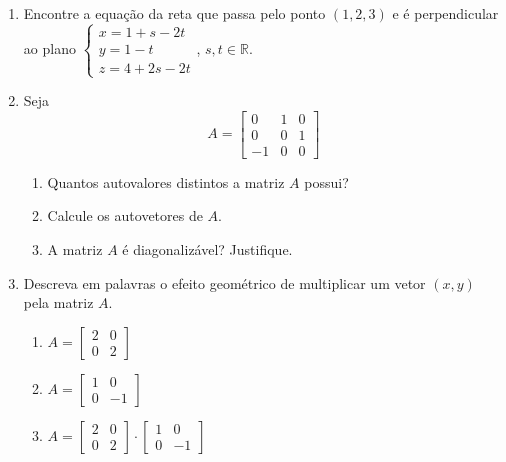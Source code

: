 \documentclass[a4paper,5pt]{amsbook}
\begin{document}
\begin{enumerate}
	\vspace{0.5cm}
	\item Encontre a equa\c{c}\~ao da reta que passa pelo ponto $(1,2,3)$ e \'e perpendicular ao plano
		$\left\{\begin{array}{l}
				x = 1+s-2t \\
				y = 1-t \\
				z = 4+2s-2t
			\end{array}\right.$, $s, t\in{} \mathbb{R}$.

	\vspace{0.5cm}
	\item Seja
		\[A = \left[\begin{array}{ccc}
				0 & 1 & 0 \\
				0 & 0 & 1 \\
				-1 & 0 & 0
			\end{array}\right]\]
		\begin{enumerate}
			\vspace{0.3cm}
			\item Quantos autovalores distintos a matriz $A$ possui?
			\vspace{0.3cm}
			\item Calcule os autovetores de $A$.
			\vspace{0.3cm}
			\item A matriz $A$ \'e diagonaliz\'avel? Justifique.
		\end{enumerate}

	\vspace{0.5cm}
	\item Descreva em palavras o efeito geom\'etrico de multiplicar um vetor $(x,y)$ pela matriz $A$.
		\begin{enumerate}
			\vspace{0.3cm}
			\item $A = \left[\begin{array}{cc}
						2 & 0 \\
						0 & 2
					\end{array}\right]$
			\vspace{0.3cm}
			\item $A = \left[\begin{array}{cc}
						1 & 0 \\
						0 & -1
					\end{array}\right]$
			\vspace{0.3cm}
			\item $A = \left[\begin{array}{cc}
						2 & 0 \\
						0 & 2
					\end{array}\right]\cdot
					\left[\begin{array}{cc}
						1 & 0 \\
						0 & -1
					\end{array}\right]$
		\end{enumerate}
\end{enumerate}
\end{document}
